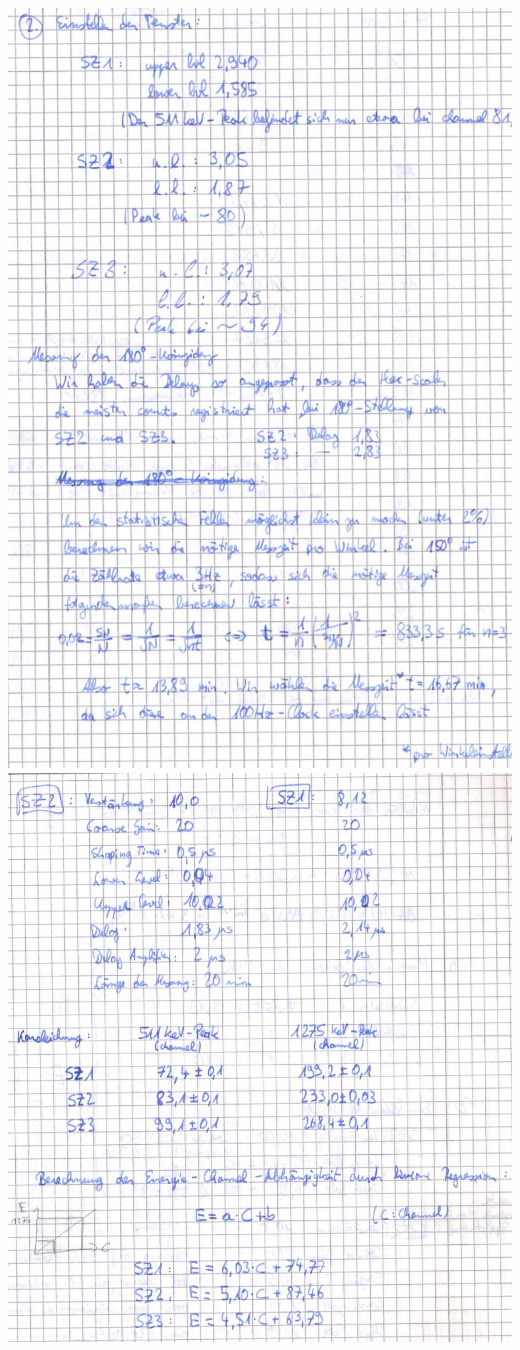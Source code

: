 \clearpage
\includegraphics[scale=0.55]{Messprotokoll/0003.jpeg}
\clearpage
\includegraphics[scale=0.55]{Messprotokoll/0004.jpeg}
